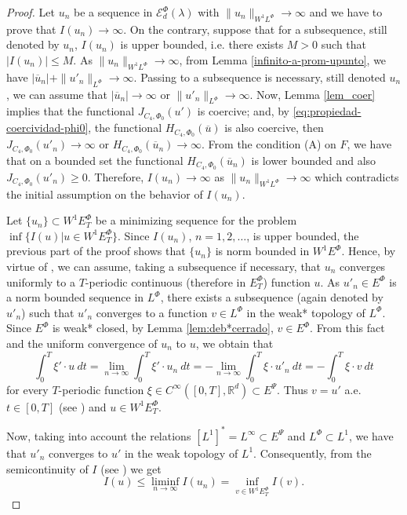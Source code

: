\documentclass[twoside]{article}
\theoremstyle{remark}
\newcommand{\orlnor}{\|_{L^{\Phi}}}
\newcommand{\lphi}{L^{\Phi}}
\newcommand{\ephi}{E^{\Phi}}
\newcommand{\wphiet}{W^{1}\ephi_T}
\newcommand{\wphie}{W^{1}\ephi}
\newcommand{\sobnor}{\|_{W^{1}\lphi}}
\newcommand{\domi}{\mathcal{E}^{\Phi}_d(\lambda)}
\newcommand{\rr}{\mathbb{R}}
\renewcommand{\leq}{\leqslant}
\renewcommand{\geq}{\geqslant}
\newcommand{\epsi}{E^{\Psi}}
\begin{document}
\begin{proof}
Let $u_n$ be  a sequence in $\domi$ with
$\|u_n\sobnor\to\infty$ and we have to prove that $I(u_n)\to\infty$.
On the contrary, suppose  that for a subsequence,
still denoted by $u_n$, $I(u_n)$ is upper bounded, i.e. there exists $M>0$ such that $|I(u_{n})|\leq M$.
As $\|u_n\sobnor\to\infty$, from Lemma \ref{infinito-a-prom-upunto},  we have $|\overline{u}_n|+\|u'_n\orlnor\to \infty$. Passing to a subsequence is necessary, still denoted $u_n$, we can assume that $|\overline{u}_n|\to \infty$ or $\|u'_n\orlnor\to \infty$.
Now, Lemma \ref{lem_coer} implies that the functional $J_{C_4,\Phi_0}(u')$ is coercive;
and, by \eqref{eq:propiedad-coercividad-phi0},
the functional $H_{C_4,\Phi_0}(\overline{u})$ is also coercive, then
$J_{C_4,\Phi_0}(u'_n) \to \infty$ or $H_{C_4,\Phi_0}(\overline{u}_n)\to \infty$.
From the condition (A) on $F$, we have that on a bounded set the functional $H_{C_4,\Phi_0}(\overline{u}_n)$ is lower bounded and 
also $J_{C_4,\Phi_0}(u'_n)\geq 0$.
Therefore,  $I(u_n)\to\infty$ as $\|u_n\sobnor\to\infty$ which contradicts the initial assumption on the behavior of $I(u_n)$.

Let $\{u_n\}\subset \wphiet$  be a  minimizing sequence for the problem  $\inf\{I(u)|u\in\wphiet\}$.
Since  $I(u_n)$, $n=1,2,\ldots$,  is upper bounded, the previous part of the proof shows that $\{u_n\}$ is norm bounded in $\wphie$. Hence, by virtue of  \cite[Cor. 2.2]{ABGMS2015}, we can assume, taking a subsequence if necessary, that $u_n$ converges uniformly to a $T$-periodic continuous (therefore in $\ephi_T$)  function $u$. As $u'_n \in \ephi$ is a norm bounded sequence in $\lphi$,
there exists a subsequence (again denoted by $u'_n$) such that $u'_n$ converges to a function $v\in\lphi$ in the weak* topology of $\lphi$.
Since $\ephi$ is weak* closed, by Lemma \ref{lem:deb*cerrado}, $v\in \ephi$. From this fact and the uniform convergence of $u_n$ to $u$, we obtain that
\[
\int_0^T\xi'\cdot u\ dt=\lim_{n\to\infty}\int_0^T\xi'\cdot u_n \ dt=
-\lim_{n\to\infty}\int_0^T\xi\cdot u'_n\ dt=-\int_0^T\xi\cdot v\ dt
\]
for every $T$-periodic function $\xi\in C^{\infty}([0,T],\rr^d)\subset\epsi$.
Thus $v=u'$ a.e. $t\in [0,T]$ (see \cite[p. 6]{mawhin2010critical}) and $u\in\wphiet$.

Now, taking into account the relations $\left[L^1\right]^*=L^{\infty}\subset  \epsi$ and $\lphi\subset L^1$, we have that $u'_n$ converges to $u'$ in the weak topology of $L^1$. Consequently,  from the semicontinuity of $I$ (see \cite[Lemma 6.1]{ABGMS2015})  we get 
\[I(u)\leq  \liminf_{n\to\infty}I(u_n)=\inf\limits_{v\in\wphie_T}I(v).\]


\end{proof}
\end{document}

